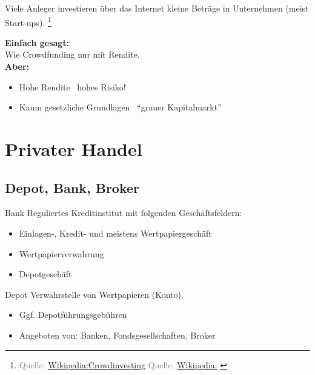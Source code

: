 \documentclass{beamer}
\newcommand{\n}{\hfill\\\vspace{0.25cm}}
\let\oldfootnote\footnote
\renewcommand{\footnote}[1]
{%
	\oldfootnote
	{
		\tiny
		\textcolor{gray}{#1}
	}%
}
\newcommand{\citewiki}[2][]
{%
	\footnote
	{
		\ifthenelse{\isempty{#1}}
		{
			Quelle: \href{https://de.wikipedia.org/wiki/#2}{Wikipedia:#2}
		}
		{
			Quelle: \href{https://de.wikipedia.org/wiki/#2}{Wikipedia:#1}
		}
	}
}
\begin{document}
			\begin{frame}
				\begin{definition}
					Viele Anleger investieren über das Internet kleine Beträge in Unternehmen (meist  Start-ups).\citewiki{Crowdinvesting}
				\end{definition}
				\textbf{Einfach gesagt:}\\
				Wie Crowdfunding nur mit Rendite.\n
				\textbf{Aber:}
				\begin{itemize}
					\item Hohe Rendite \textrightarrow\ hohes Risiko!
					\item Kaum gesetzliche Grundlagen \textrightarrow\ "`grauer Kapitalmarkt"'
				\end{itemize}
			\end{frame}
	
	\section{Privater Handel}
	
		\begin{frame}
		\end{frame}
	
		\subsection{Depot, Bank, Broker}
		
			\begin{frame}{Bank}
				Reguliertes Kreditinstitut mit folgenden Geschäftsfeldern:
				\begin{itemize}
					\item Einlagen-, Kredit- und meistens Wertpapiergeschäft
					\item Wertpapierverwahrung
					\item Depotgeschäft
				\end{itemize}
			\end{frame}
		
			\begin{frame}{Depot}
				Verwahrstelle von Wertpapieren (Konto).
				\begin{itemize}
					\item Ggf. Depotführungsgebühren
					\item Angeboten von: Banken, Fondsgesellschaften, Broker
				\end{itemize}
			\end{frame}
		
\end{document}
